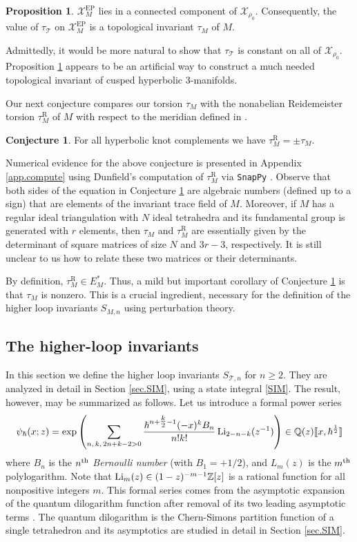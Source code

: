 \documentclass[12pt]{amsart}
\newcommand{\lbl}{\label}
\newcommand{\Reid}{\mathrm{R}}
\theoremstyle{definition}
\newtheorem{proposition}[theorem]{Proposition}
\newtheorem{conjecture}[theorem]{Conjecture}
\def\BZ{\mathbb Z}
\def\BQ{\mathbb Q}
\def\calX{\mathcal X}
\def\be{  \begin{equation} }
\def\ee{  \end{equation} }
\def\hb{\hbar}
\def\EP{\mathrm{EP}}
\newcommand{\CT}{\mathcal{T}}
\newcommand{\Li}{{\rm Li}}
\numberwithin{equation}{section}
\begin{document}
\begin{proposition}
\lbl{prop.EP}
$\calX^{\EP}_M$ lies in a connected component of $\calX_{\rho_0}$.
Consequently, the value of $\tau_{\CT}$ on $\calX^{\EP}_M$ is a
topological invariant $\tau_M$ of $M$.
\end{proposition}

\noindent Admittedly, it would be more natural to show that $\tau_\CT$ is constant on all of $\calX_{\rho_0}$.
Proposition \ref{prop.EP} appears 
to be an artificial way to construct a much needed topological invariant
of cusped hyperbolic 3-manifolds.

Our next conjecture compares our torsion $\tau_M$ with the 
nonabelian Reidemeister torsion $\tau^{\Reid}_M$ of $M$ with respect
to the meridian defined in \cite{Po,Db}. 
%
\begin{conjecture}
\lbl{conj.1loop}
For all hyperbolic knot complements we have
$\tau^{\Reid}_M=\pm \tau_{M}$.
\end{conjecture}
%
\noindent 
Numerical evidence for the above conjecture is presented in
Appendix \ref{app.compute} using Dunfield's computation of $\tau^{\Reid}_M$
via {\tt SnapPy} \cite{DFJ}. Observe that both sides of the equation in
Conjecture \ref{conj.1loop} are algebraic numbers (defined up to a sign) 
that are elements of the invariant trace field of $M$. Moreover, if $M$ has
a regular ideal triangulation with $N$ ideal tetrahedra and its 
fundamental group is generated with $r$ elements, then $\tau_M$ and
$\tau^{\Reid}_M$ are essentially given by the determinant of square matrices
of size $N$ and $3 r-3$, respectively. It is still unclear to us
how to relate these two matrices or their determinants.

By definition, $\tau^{\Reid}_M \in E_M^*$. Thus, a mild but important 
corollary of Conjecture \ref{conj.1loop} is that $\tau_M$ is nonzero. 
This is a crucial ingredient, necessary for the definition of the higher
loop invariants $S_{M,n}$ using perturbation theory.


\subsection{The higher-loop invariants}
\lbl{sub.nloop}


In this section we define the higher loop invariants $S_{\CT,n}$ for $n \geq 2$. They are analyzed in detail in Section \ref{sec.SIM}, using a state integral \eqref{SIM}. The result, however, may be summarized as follows.
Let us introduce a formal power series 
\be
\lbl{eq.psixz}
\psi_{\hb}(x;z)=\exp\left(
\sum_{n,\, k,\, 2n+k-2 > 0} 
\frac{\hb^{n+\tfrac k2-1} (-x)^kB_n}{n!k!}\, \Li_{2-n-k}(z^{-1})
\right) \in \BQ(z)[\![x,\hbar^{\frac12}]\!]
\ee
where $B_n$ is the $n^{\rm th}$ {\em Bernoulli number} (with $B_1=+1/2$),
and $L_m(z)$ is the $m^{\rm th}$ polylogarithm. Note that 
$\Li_m(z) \in (1-z)^{-m-1}\BZ[z]$ is a rational function for all nonpositive integers $m$. This formal series comes from the asymptotic expansion of the 
quantum dilogarithm function after removal of its two leading asymptotic
terms \cite{Ba, FK-QDL, Fa}. The quantum dilogarithm is 
the Chern-Simons partition function of a single tetrahedron and its asymptotics
are studied in detail in Section \ref{sec.SIM}.
\end{document}
